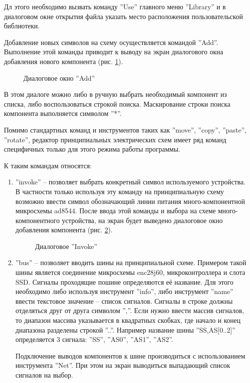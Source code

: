 Дл этого необходимо вызвать команду ''Use'' главного меню ''Library'' и в диалоговом окне открытия файла
указать место расположения пользовательской библиотеки.


Добавление новых символов на схему осуществляется командой ''Add''. Выполнение этой команды приводит к
выводу на экран диалогового окна добавления нового компонента (рис. \ref{img:addDlg}).
\begin{figure}[ht]
	\caption{Диалоговое окно ''Add''}
	\label{img:addDlg}
\end{figure}

В этом диалоге можно либо в ручную выбрать необходимый компонент из списка, либо воспользоваться строкой поиска.
Маскирование строки поиска компонента выполняется символом ''*''.


Помимо стандартных команд и инструментов таких как ''move'', ''copy'', ''paste'', ''rotate'',
редактор принципиальных электрических схем имеет ряд команд специфичных только для этого
режима работы программы.

К таким командам относятся:

\begin{enumerate}
	\item ''invoke'' -- позволяет выбрать конкретный символ используемого устройства. В частности
	только используя эту команду на принципиальную схему возможно ввести символ обозначающий линии
	питания много-компонентной микросхемы ad8544. После ввода этой команды и выбора на схеме 
	много-компонентного устройства, на экран будет выведено диалоговое окно добавления компонента (рис. \ref{img:addGateDlg}).
	
	\begin{figure}[ht]
		\caption{Диалоговое ''Invoke''}
		\label{img:addGateDlg}
	\end{figure}
	
	
	\item ''bus'' -- позволяет вводить шины на принципиальной схеме. Примером такой шины является
		соединение микросхемы enc28j60, микроконтроллера и слота SSD.
		Сигналы проходящие пошине определяются её название.
		Для этого необходимо либо используя инструмент ''info'', либо инструмент ''name'' ввести
		текстовое значение -- список сигналов. Сигналы в строке должны отделяться друг от друга
		символом '',''. Если нужно ввести массив сигналов, то диапазон массива указывается в
		квадратных скобках, где начало и конец диапазона разделены строкой ''..''. Например
		название шины ''SS,AS[0..2]'' определяется 3 сигнала: ''SS'', ''AS0'', ''AS1'', ''AS2''.
		
		Подключение выводов компонентов к шине производиться с использованием инструмента ''Net''.
		При этом на экран выводиться выпадающий список сигналов на выбор.
	 
\end{enumerate}


